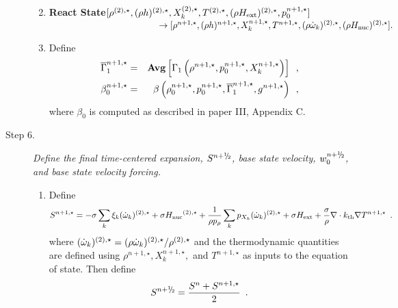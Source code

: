 \begin{description}
\begin{enumerate}
\renewcommand{\theenumi}{{\bf \alph{enumi}}}

\item {\bf React State}$[ \rho^{(2),\star},(\rho h)^{(2),\star}, X_k^{(2),\star}, 
                             T^{(2),\star}, (\rho{H_{\rm ext}})^{(2),\star}, p_0^{n+1,\star}] $\\
$~~~~~~~~~~~~~~~~~~~~~~~~~~~~~~~~~~~~~\rightarrow [ \rho^{n+1,\star},(\rho h)^{n+1,\star}, 
X_k^{n+1,\star}, T^{n+1,\star}, (\rho \dot{\omega}_k)^{(2),\star}, (\rho {H_{\rm nuc}})^{(2),\star} ].$  

\item Define
\begin{eqnarray}
 \overline{\Gamma}_1^{n+1,\star}    &=& {\rm{\bf Avg}} \left[ \Gamma_1\left(\rho^{n+1,\star}, p_0^{n+1,\star}, 
                                                      X_k^{n+1,\star}\right) \right] \enskip , \\
 \beta_0^{n+1,\star}    &=& \beta   \left(\rho_0^{n+1,\star}, p_0^{n+1,\star}, \overline{\Gamma}_1^{n+1,\star}, g^{n+1,\star}\right) \enskip ,
\end{eqnarray}
where $\beta_0$ is computed as described in paper III, Appendix C.

\end{enumerate}

\item[Step 6.] {\em Define the final time-centered expansion, $S^{n+\myhalf}$, 
base state velocity, $w_0^{n+\myhalf}$, and base state velocity forcing.}

\begin{enumerate}
\renewcommand{\theenumi}{{\bf \alph{enumi}}}
\item Define
\begin{equation}
  S^{n+1,\star} =  -\sigma  \sum_k  \xi_k  (\dot{\omega}_k)^{(2),\star}  + 
  \sigma {H_{\rm nuc}}^{(2),\star} +
  \frac{1}{\rho p_\rho} \sum_k p_{X_k}  ({\dot{\omega}}_k)^{(2),\star}  
  + \sigma {H_{\rm ext}} + \frac{\sigma}{\rho}\nabla\cdot k_{\rm th}\nabla T^{n+1,\star} \enskip .
\end{equation} 
where $(\dot{\omega}_k)^{(2),\star} = (\rho \dot{\omega}_k)^{(2),\star} / \rho^{(2),\star}$
and the thermodynamic quantities are defined using $\rho^{n+1,\star}, X_k^{n+1,\star},$ 
and $T^{n+1,\star}$ as inputs to the equation of state.
Then define
\begin{equation}
 S^\nph = \frac{S^n + S^{n+1,\star}}{2} \enskip. 
\end{equation}


\end{enumerate}
\end{description}
